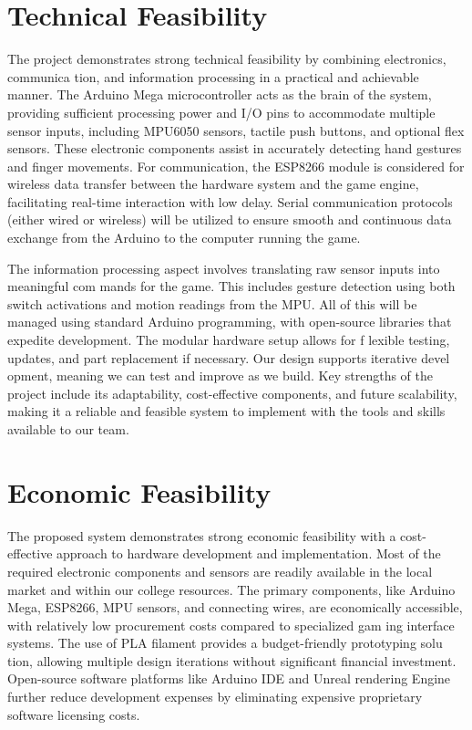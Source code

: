 \section{Technical Feasibility}

 The project demonstrates strong technical feasibility by combining electronics, communica
tion, and information processing in a practical and achievable manner. The Arduino Mega
 microcontroller acts as the brain of the system, providing sufficient processing power and I/O
 pins to accommodate multiple sensor inputs, including MPU6050 sensors, tactile push buttons,
 and optional flex sensors. These electronic components assist in accurately detecting hand
 gestures and finger movements. For communication, the ESP8266 module is considered for
 wireless data transfer between the hardware system and the game engine, facilitating real-time
 interaction with low delay. Serial communication protocols (either wired or wireless) will be
 utilized to ensure smooth and continuous data exchange from the Arduino to the computer
 running the game.

  The information processing aspect involves translating raw sensor inputs into meaningful com
mands for the game. This includes gesture detection using both switch activations and motion
 readings from the MPU. All of this will be managed using standard Arduino programming,
 with open-source libraries that expedite development. The modular hardware setup allows for
 f
 lexible testing, updates, and part replacement if necessary. Our design supports iterative devel
opment, meaning we can test and improve as we build. Key strengths of the project include its
 adaptability, cost-effective components, and future scalability, making it a reliable and feasible
 system to implement with the tools and skills available to our team.

\section{Economic Feasibility}

 The proposed system demonstrates strong economic feasibility with a cost-effective approach
 to hardware development and implementation. Most of the required electronic components
 and sensors are readily available in the local market and within our college resources. The
 primary components, like Arduino Mega, ESP8266, MPU sensors, and connecting wires, are
 economically accessible, with relatively low procurement costs compared to specialized gam
ing interface systems. The use of PLA filament provides a budget-friendly prototyping solu
tion, allowing multiple design iterations without significant financial investment. Open-source
 software platforms like Arduino IDE and Unreal rendering Engine further reduce development
 expenses by eliminating expensive proprietary software licensing costs.

